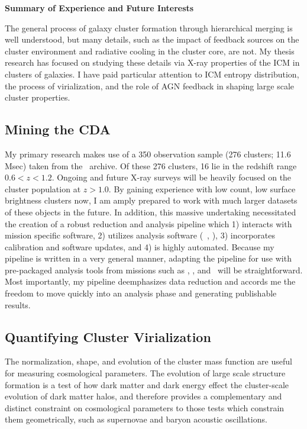 \documentclass[11pt]{article}
\begin{document}
\begin{center}
\large
\textbf{Summary of Experience and Future Interests}
\normalsize
\end{center}

The general process of galaxy cluster formation through hierarchical
merging is well understood, but many details, such as the impact of
feedback sources on the cluster environment and radiative cooling in
the cluster core, are not. My thesis research has focused on studying
these details via X-ray properties of the ICM in clusters of
galaxies. I have paid particular attention to ICM entropy
distribution, the process of virialization, and the role of AGN
feedback in shaping large scale cluster properties.

\subsection*{Mining the CDA}

My primary research makes use of a 350 observation sample (276
clusters; 11.6 Msec) taken from the \Chandra\ archive. Of these 276
clusters, 16 lie in the redshift range $0.6 < z < 1.2$. Ongoing and
future X-ray surveys will be heavily focused on the cluster population
at $z > 1.0$. By gaining experience with low count, low surface
brightness clusters now, I am amply prepared to work with much larger
datasets of these objects in the future. In addition, this massive
undertaking necessitated the creation of a robust reduction and
analysis pipeline which 1) interacts with mission specific software,
2) utilizes analysis software (\eg\ \xspec, \idl), 3)
incorporates calibration and software updates, and 4) is highly
automated. Because my pipeline is written in a very general manner,
adapting the pipeline for use with pre-packaged analysis tools from
missions such as \Xmm, \Spitzer, and \vla\ will be
straightforward. Most importantly, my pipeline deemphasizes data
reduction and accords me the freedom to move quickly into an analysis
phase and generating publishable results.

\subsection*{Quantifying Cluster Virialization}

The normalization, shape, and evolution of the cluster mass function
are useful for measuring cosmological parameters. The evolution of large
scale structure formation is a test of how dark matter and dark energy
effect the cluster-scale evolution of dark matter halos, and therefore
provides a complementary and distinct constraint on cosmological
parameters to those tests which constrain them geometrically,
such as supernovae and baryon acoustic oscillations.
\end{document}
